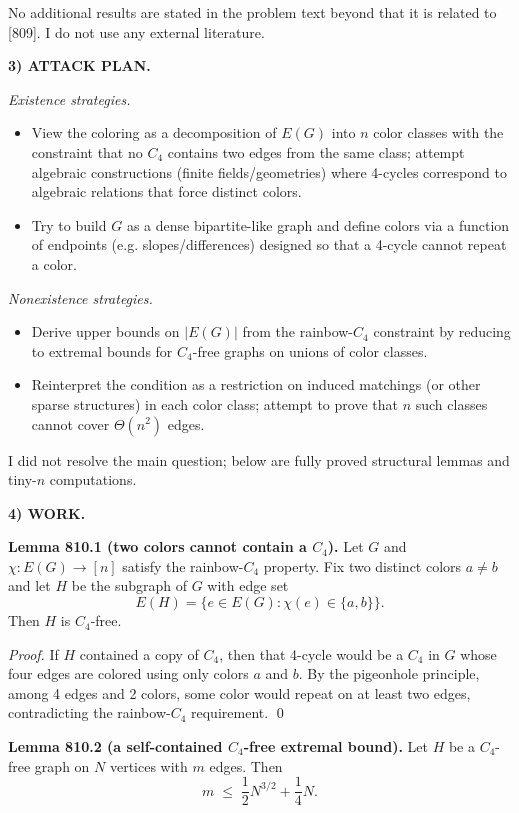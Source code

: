 No additional results are stated in the problem text beyond that it is related to [809]. I do not use any external literature.

\medskip
\noindent\textbf{3) ATTACK PLAN.}

\emph{Existence strategies.}
\begin{itemize}
\item View the coloring as a decomposition of $E(G)$ into $n$ color classes with the constraint that no $C_4$ contains two edges from the same class; attempt algebraic constructions (finite fields/geometries) where 4-cycles correspond to algebraic relations that force distinct colors.
\item Try to build $G$ as a dense bipartite-like graph and define colors via a function of endpoints (e.g. slopes/differences) designed so that a 4-cycle cannot repeat a color.
\end{itemize}

\emph{Nonexistence strategies.}
\begin{itemize}
\item Derive upper bounds on $|E(G)|$ from the rainbow-$C_4$ constraint by reducing to extremal bounds for $C_4$-free graphs on unions of color classes.
\item Reinterpret the condition as a restriction on induced matchings (or other sparse structures) in each color class; attempt to prove that $n$ such classes cannot cover $\Theta(n^2)$ edges.
\end{itemize}

I did not resolve the main question; below are fully proved structural lemmas and tiny-$n$ computations.

\medskip
\noindent\textbf{4) WORK.}

\textbf{Lemma 810.1 (two colors cannot contain a $C_4$).}
Let $G$ and $\chi:E(G)\to [n]$ satisfy the rainbow-$C_4$ property. Fix two distinct colors $a\ne b$ and let $H$ be the subgraph of $G$ with edge set
\[
E(H)=\{e\in E(G):\chi(e)\in\{a,b\}\}.
\]
Then $H$ is $C_4$-free.

\emph{Proof.}
If $H$ contained a copy of $C_4$, then that 4-cycle would be a $C_4$ in $G$ whose four edges are colored using only colors $a$ and $b$. By the pigeonhole principle, among 4 edges and 2 colors, some color would repeat on at least two edges, contradicting the rainbow-$C_4$ requirement.
\qed

\textbf{Lemma 810.2 (a self-contained $C_4$-free extremal bound).}
Let $H$ be a $C_4$-free graph on $N$ vertices with $m$ edges. Then
\[
 m\;\le\; \frac12 N^{3/2}+\frac14 N.
\]

